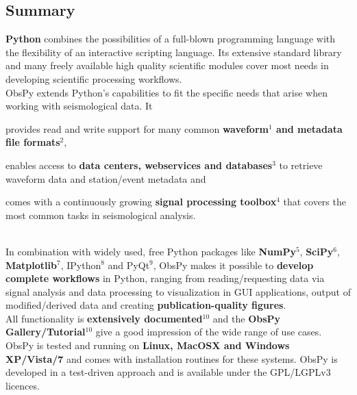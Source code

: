 \documentclass[final]{lmuposter}
\begin{document}
\begin{multicols}{3}
{\section*{Summary}
\textbf{Python} combines the possibilities of a full-blown programming language with the flexibility of an interactive scripting language. Its extensive standard library and many freely available high quality scientific modules cover most needs in developing scientific processing workflows.\\
ObsPy extends Python's capabilities to fit the specific needs that arise when working with seismological data. It \begin{inparaenum} \item provides read and write support for many common \textbf{\color{red}waveform{\small\color{blue}$^1$} and metadata file formats}{\small\color{blue}$^2$}, \item enables access to \textbf{\color{blue}data centers, webservices and databases}{\small\color{blue}$^3$} to retrieve waveform data and station/event metadata and \item comes with a continuously growing \textbf{\color{green}signal processing toolbox}{\small\color{blue}$^4$} that covers the most common tasks in seismological analysis. \end{inparaenum}\\
In combination with widely used, free Python packages like \textbf{NumPy}{\small\color{blue}$^5$}, \textbf{SciPy}{\small\color{blue}$^6$}, \textbf{Matplotlib}{\small\color{blue}$^7$}, IPython{\small\color{blue}$^8$} and PyQt{\small\color{blue}$^9$}, ObsPy makes it possible to \textbf{develop complete workflows} in Python, ranging from reading/requesting data via signal analysis and data processing to visualization in GUI applications, output of modified/derived data and creating \textbf{publication-quality figures}.\\
All functionality is \textbf{extensively documented}{\small\color{blue}$^{10}$} and the \textbf{ObsPy Gallery/Tutorial}{\small\color{blue}$^{10}$} give a good impression of the wide range of use cases. ObsPy is tested and running on \textbf{Linux, MacOSX and Windows XP/Vista/7} and comes with installation routines for these systems. ObsPy is developed in a test-driven approach and is available under the GPL/LGPLv3 licences.\\
}
\end{multicols}
\end{document}
